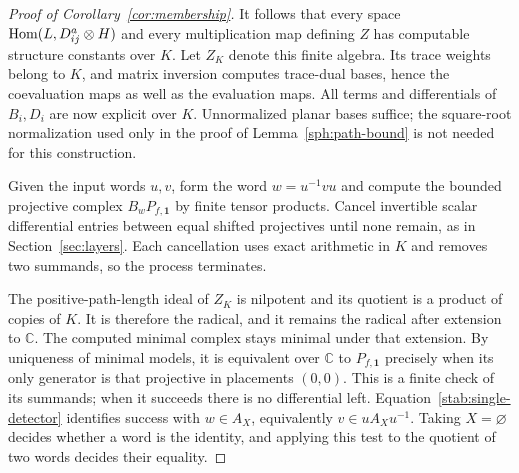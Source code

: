 \begin{proof}[Proof of Corollary~\ref{cor:membership}]
It follows that every space
$\operatorname{Hom}(L,D^a_{ij}\otimes H)$ and every multiplication map defining $Z$
has computable structure constants over $K$. Let $Z_K$ denote this
finite algebra. Its trace weights belong to $K$, and matrix inversion
computes trace-dual bases, hence the coevaluation maps as well as the
evaluation maps. All terms and differentials of $B_i,D_i$ are now
explicit over $K$. Unnormalized planar bases suffice; the square-root
normalization used only in the proof of Lemma~\ref{sph:path-bound}
is not needed for this construction.

Given the input words $u,v$, form the word $w=u^{-1}vu$ and compute the
bounded projective complex $B_wP_{f,\mathbf1}$ by finite tensor products.
Cancel invertible scalar differential entries between equal shifted
projectives until none remain, as in Section~\ref{sec:layers}. Each
cancellation uses exact arithmetic in $K$ and removes two summands,
so the process terminates.

The positive-path-length ideal of $Z_K$ is nilpotent and its quotient is
a product of copies of $K$. It is therefore the radical, and it remains
the radical after extension to $\mathbb C$. The computed minimal complex
stays minimal under that extension. By uniqueness of minimal models,
it is equivalent over $\mathbb C$ to $P_{f,\mathbf1}$ precisely when its
only generator is that projective in placements $(0,0)$. This is a finite
check of its summands; when it succeeds there is no differential left.
Equation~\eqref{stab:single-detector} identifies success with $w\in A_X$,
equivalently $v\in uA_Xu^{-1}$. Taking $X=\varnothing$ decides whether a
word is the identity, and applying this test to the quotient of two words
decides their equality.
\end{proof}
